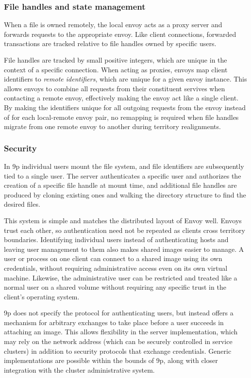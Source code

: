\subsubsection{File handles and state management}

When a file is owned remotely, the local envoy acts as a proxy server and forwards requests to the appropriate envoy. Like client connections, forwarded transactions are tracked relative to file handles owned by specific users.

File handles are tracked by small positive integers, which are unique in the context of a specific connection. When acting as proxies, envoys map client identifiers to \emph{remote identifiers}, which are unique for a given envoy instance. This allows envoys to combine all requests from their constituent servives when contacting a remote envoy, effectively making the envoy act like a single client. By making the identifiers unique for all outgoing requests from the envoy instead of for each local-remote envoy pair, no remapping is required when file handles migrate from one remote envoy to another during territory realignments.

\subsubsection{Security}

In 9p individual users mount the file system, and file identifiers are subsequently tied to a single user. The server authenticates a specific user and authorizes the creation of a specific file handle at mount time, and additional file handles are produced by cloning existing ones and walking the directory structure to find the desired files.

This system is simple and matches the distributed layout of Envoy well. Envoys trust each other, so authentication need not be repeated as clients cross territory boundaries. Identifying individual users instead of authenticating hosts and leaving user management to them also makes shared images easier to manage. A user or process on one client can connect to a shared image using its own credentials, without requiring administrative access even on its own virtual machine. Likewise, the administrative user can be restricted and treated like a normal user on a shared volume without requiring any specific trust in the client's operating system.

9p does not specify the protocol for authenticating users, but instead offers a mechanism for arbitrary exchanges to take place before a user succeeds in attaching an image. This allows flexibility in the server implementation, which may rely on the network address (which can be securely controlled in service clusters) in addition to security protocols that exchange credentials. Generic implementations are possible within the bounds of 9p, along with closer integration with the cluster administrative system.

